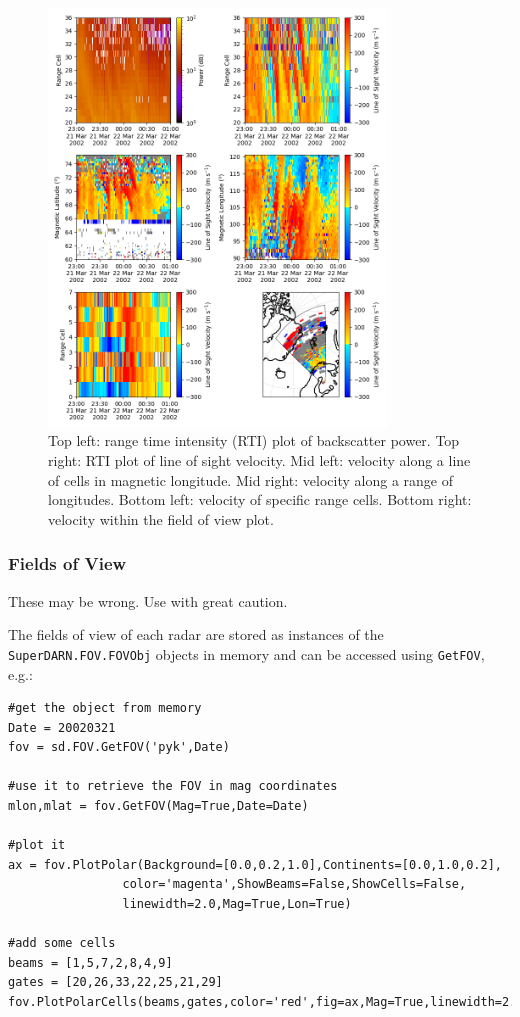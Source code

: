 				\begin{figure}
					\centering\includegraphics[width=0.8\textwidth]{figures/ch05_sdexample.png}
					\caption{Top left: range time intensity (RTI) plot of backscatter power. Top right: RTI plot of line of sight velocity. Mid left: velocity along a line of cells in magnetic longitude. Mid right: velocity along a range of longitudes. Bottom left: velocity of specific range cells. Bottom right: velocity within the field of view plot. \label{FigSDExample} }
				\end{figure}

			\subsubsection{Fields of View}
			
				These may be wrong. Use with great caution.
			
				The fields of view of each radar are stored as instances of the \texttt{SuperDARN.FOV.FOVObj} objects in memory and can be accessed using \texttt{GetFOV}, e.g.:
			
				\begin{verbatim}
#get the object from memory
Date = 20020321
fov = sd.FOV.GetFOV('pyk',Date)
			
#use it to retrieve the FOV in mag coordinates
mlon,mlat = fov.GetFOV(Mag=True,Date=Date)
			
#plot it
ax = fov.PlotPolar(Background=[0.0,0.2,1.0],Continents=[0.0,1.0,0.2],
				color='magenta',ShowBeams=False,ShowCells=False,
				linewidth=2.0,Mag=True,Lon=True)
			
#add some cells
beams = [1,5,7,2,8,4,9]
gates = [20,26,33,22,25,21,29]
fov.PlotPolarCells(beams,gates,color='red',fig=ax,Mag=True,linewidth=2.0,Lon=True)
				\end{verbatim}
			
